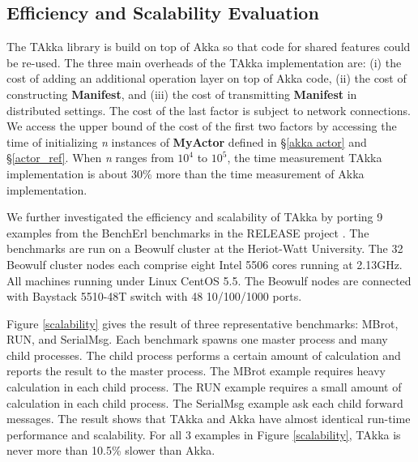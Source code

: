\subsection{Efficiency and Scalability Evaluation}
The TAkka library is build on top of Akka so that code for shared features could
be re-used.  The three main overheads of the TAkka implementation are: (i) the
cost of adding an additional operation layer on top of Akka code, (ii) the cost
of constructing {\bf Manifest}, and (iii) the cost of transmitting {\bf
Manifest} in distributed settings.  The cost of the last factor is subject to
network connections.  We access the upper bound of the cost of the first two
factors by accessing the time of initializing {\it n} instances of {\bf MyActor}
defined in \S\ref{akka actor} and \S\ref{actor_ref}.  When {\it n} ranges from
$10^4$ to $10^5$, the time measurement TAkka implementation is about 30\% more
than the time measurement of Akka implementation.

We further investigated the efficiency and scalability of TAkka by porting
9 examples from the BenchErl benchmarks in the RELEASE project \cite{RELEASE}.
The benchmarks are run on a Beowulf cluster at the Heriot-Watt University.
The 32 Beowulf cluster nodes each comprise eight Intel 5506 cores running at
2.13GHz. All machines running under Linux CentOS 5.5. The Beowulf nodes are
connected with Baystack 5510-48T switch with 48 10/100/1000 ports.  

Figure \ref{scalability} gives the result of three representative benchmarks: MBrot,
RUN, and SerialMsg. Each benchmark spawns one master process and many child
processes.  The child process performs a certain amount of calculation and
reports the result to the master process.  The MBrot example requires heavy
calculation in each child process.  The RUN example requires a small amount of
calculation in each child process.  The SerialMsg example ask each child forward
messages. The result shows that TAkka and Akka have almost identical run-time performance and scalability.  For all 3 examples in Figure \ref{scalability}, TAkka is never more than 10.5\% slower than Akka.

